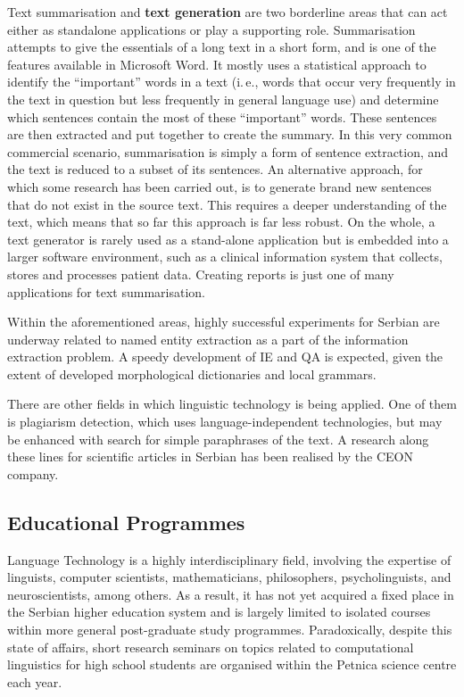 {\begin{multicols}{2}


Text summarisation and \textbf{text generation} are two borderline areas that can act either as standalone applications or play a supporting role. Summarisation attempts to give the essentials of a long text in a short form, and is one of the features available in Microsoft Word. It mostly uses a statistical approach to identify the “important” words in a text (i.\,e., words that occur very frequently in the text in question but less frequently in general language use) and determine which sentences contain the most of these “important” words. These sentences are then extracted and put together to create the summary. In this very common commercial scenario, summarisation is simply a form of sentence extraction, and the text is reduced to a subset of its sentences. An alternative approach, for which some research has been carried out, is to generate brand new sentences that do not exist in the source text. This requires a deeper understanding of the text, which means that so far this approach is far less robust. On the whole, a text generator is rarely used as a stand-alone application but is embedded into a larger software environment, such as a clinical information system that collects, stores and processes patient data. Creating reports is just one of many applications for text summarisation.


Within the aforementioned areas, highly successful experiments for Serbian are underway related to named entity extraction as a part of the information extraction problem. A speedy development of IE and QA is expected, given the extent of developed morphological dictionaries and local grammars.

There are other fields in which linguistic technology is being applied. One of them is plagiarism detection, which uses language-independent technologies, but may be enhanced with search for simple paraphrases of the text. A research along these lines for scientific articles in Serbian has been realised by the CEON company. \cite{CEON}
 \subsection {Educational Programmes}

Language Technology is a highly interdisciplinary field, involving the expertise of linguists, computer scientists, mathematicians, philosophers, psycholinguists, and neuroscientists, among others. As a result, it has not yet acquired a fixed place in the Serbian higher education system and is largely limited to isolated courses within more general post-graduate study programmes. Paradoxically, despite this state of affairs, short research seminars on topics related to computational linguistics for high school students are organised within the Petnica science centre \cite{PETNICA} each year. 


\end{multicols}}
